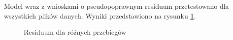 \documentclass[a4paper,12pt]{article}
\begin{document}
Model wraz z wnioskami o pseudopoprawnym residuum przetestowano dla wszystkich plików danych. Wyniki przedstawiono na rysunku \ref{fig:all}. 

\newcommand*{\ww}{.48}
\begin{figure}[H]
    \newcommand{\im}{model_test_F}
    \captionsetup[subfloat]{position=bottom,labelformat=empty} %

    \hfill%
    \hfill%
    \hfill%

    \caption{Residuum dla różnych przebiegów} %
    \label{fig:all} 
\end{figure}














\end{document}
